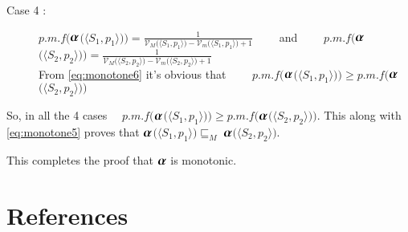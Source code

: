 \documentclass[final,3p, review, times]{util/elsarticle}
\newcommand{\ALPHA}{\large\boldsymbol{\alpha}\normalsize}
\begin{document}
\begin{description}
  \item[Case 4 :] $p.m.f\Big($$\ALPHA$$\big(\langle S_1,p_1\rangle\big)\Big)=\displaystyle\frac{1}{\mathcal{V}_M\Big(\langle S_1,p_1\rangle\Big)-\mathcal{V}_m\Big(\langle S_1,p_1\rangle\Big)+1}\qquad$ and $\qquad p.m.f\Big($$\ALPHA$$\big(\langle S_2,p_2\rangle\big)\Big)=\displaystyle\frac{1}{\mathcal{V}_M\Big(\langle S_2,p_2\rangle\Big)-\mathcal{V}_m\Big(\langle S_2,p_2\rangle\Big)+1}$ \hfill \\
    From \ref{eq:monotone6} it's obvious that $\qquad p.m.f\Big($$\ALPHA$$\big(\langle S_1,p_1\rangle\big)\Big)\geq p.m.f\Big($$\ALPHA$$\big(\langle S_2,p_2\rangle\big)\Big)$
\end{description}

So, in all the 4 cases $\quad p.m.f\Big($$\ALPHA$$\big(\langle S_1,p_1\rangle\big)\Big)\geq p.m.f\Big($$\ALPHA$$\big(\langle S_2,p_2\rangle\big)\Big)$. This along with \ref{eq:monotone5} proves that $\ALPHA$$\Big(\langle S_1,p_1\rangle\Big)\sqsubseteq_M\ $$\ALPHA$$\Big(\langle S_2,p_2\rangle\Big)$.

\noindent This completes the proof that $\ALPHA$ is monotonic.







 
 \section*{References}


\end{document}
